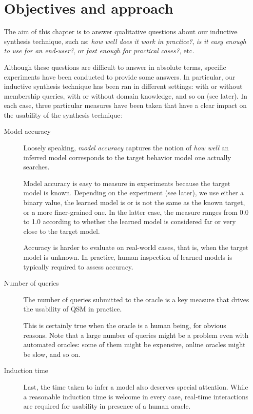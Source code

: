 \section{Objectives and approach\label{section:evaluation-objectives-and-approach}}

The aim of this chapter is to answer qualitative questions about our inductive synthesis technique, such as: \emph{how well does it work in practice?}, \emph{is it easy enough to use for an end-user?}, or \emph{fast enough for practical cases?}, etc. 

Although these questions are difficult to answer in absolute terms, specific experiments have been conducted to provide some answers. In particular, our inductive synthesis technique has been ran in different settings: with or without membership queries, with or without domain knowledge, and so on (see later). In each case, three particular measures have been taken that have a clear impact on the usability of the synthesis technique:
\begin{description}
\item[Model accuracy] Loosely speaking, \emph{model accuracy} captures the notion of \emph{how well} an inferred model corresponds to the target behavior model one actually searches. 

Model accuracy is easy to measure in experiments because the target model is known. Depending on the experiment (see later), we use either a binary value, the learned model is or is not the same as the known target, or a more finer-grained one. In the latter case, the measure ranges from 0.0 to 1.0 according to whether the learned model is considered far or very close to the target model. 

Accuracy is harder to evaluate on real-world cases, that is, when the target model is unknown. In practice, human inspection of learned models is typically required to assess accuracy.

\item[Number of queries] The number of queries submitted to the oracle is a key measure that drives the usability of QSM in practice. 

This is certainly true when the oracle is a human being, for obvious reasons. Note that a large number of queries might be a problem even with automated oracles: some of them might be expensive, online oracles might be slow, and so on.

\item[Induction time] Last, the time taken to infer a model also deserves special attention. While a reasonable induction time is welcome in every case, real-time interactions are required for usability in presence of a human oracle.
\end{description}

